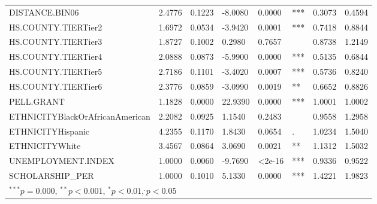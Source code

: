 \documentclass[12pt,english]{report}
\begin{document}
\begin{table}[H]
\begin{adjustbox}{width=0.95\textwidth}
\begin{tabular}{|llllllll|}
DISTANCE.BIN06                  & 2.4776   & 0.1223     & -8.0080 & 0.0000     & ***         & 0.3073 & 0.4594 \\
HS.COUNTY.TIERTier2             & 1.6972   & 0.0534     & -3.9420 & 0.0001     & ***         & 0.7418 & 0.8844 \\
HS.COUNTY.TIERTier3             & 1.8727   & 0.1002     & 0.2980  & 0.7657     &             & 0.8738 & 1.2149 \\
HS.COUNTY.TIERTier4             & 2.0888   & 0.0873     & -5.9900 & 0.0000     & ***         & 0.5135 & 0.6844 \\
HS.COUNTY.TIERTier5             & 2.7186   & 0.1101     & -3.4020 & 0.0007     & ***         & 0.5736 & 0.8240 \\
HS.COUNTY.TIERTier6             & 2.3776   & 0.0859     & -3.0990 & 0.0019     & **          & 0.6652 & 0.8826 \\
PELL.GRANT     & 1.1828   & 0.0000     & 22.9390 & 0.0000     & ***& 1.0001 & 1.0002 \\
ETHNICITYBlackOrAfricanAmerican & 2.2082   & 0.0925     & 1.1540  & 0.2483     &             & 0.9558 & 1.2958 \\
ETHNICITYHispanic               & 4.2355   & 0.1170     & 1.8430  & 0.0654     & .           & 1.0234 & 1.5040 \\
ETHNICITYWhite                  & 3.4567   & 0.0864     & 3.0690  & 0.0021     & **          & 1.1312 & 1.5032 \\
UNEMPLOYMENT.INDEX              & 1.0000   & 0.0060     & -9.7690 & \textless2e-16     & ***         & 0.9336 & 0.9522 \\
SCHOLARSHIP\_PER                & 1.0000   & 0.1010     & 5.1330  & 0.0000     & ***         & 1.4221 & 1.9823    \\
\hline %
\multicolumn{7}{l}{\scriptsize{$^{***} p=0.000$, $^{**} p<0.001$, $^*p<0.01$,$^{.}p<0.05$}}

\end{tabular}
\end{adjustbox}
\end{table}
\end{document}
